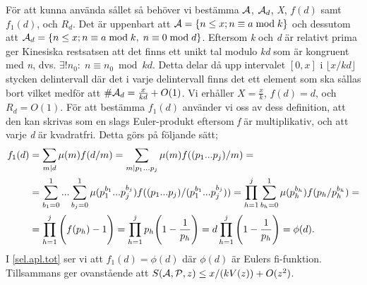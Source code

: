För att kunna använda sållet så behöver vi bestämma \(\A\), \(\A_d\), \textit{X}, \(f(d)\) samt \(f_1(d)\), och \(R_d\). 
Det är uppenbart att \(\A = \{n\leq x; n \equiv a \bmod k\}\) och dessutom att \(\A_d = \{n \leq x; n \equiv a \bmod k,\; n \equiv 0 \bmod d\}\). 
Eftersom \textit{k} och \textit{d} är relativt prima ger Kinesiska restsatsen att det finns ett unikt tal modulo \textit{kd} som är kongruent med \textit{n}, dvs. \(\exists! n_0:\; n \equiv n_0 \bmod kd\). 
Detta delar då upp intervalet \([0, x]\) i \(\lfloor x/{kd}\rfloor\) stycken delintervall där det i varje delintervall finns det ett element som ska sållas bort vilket medför att \(\#\A_d = \frac{x}{kd} + O(1)\). 
Vi erhåller \(X = \frac{x}{k}\), \(f(d) = d\), och \(R_d = O(1)\). 
För att bestämma \(f_1(d)\) använder vi oss av dess definition, att den kan skrivas som en slags Euler-produkt eftersom \textit{f} är multiplikativ, och att varje \textit{d} är kvadratfri. 
Detta görs på följande sätt;
\begin{align}
    f_1(d) &= \sum_{m\divides d}\mu(m)f(d/m) = \sum_{m\divides p_1...p_j}\mu(m)f((p_1...p_j)/m) = \nonumber\\
    &=\sum_{b_1 = 0}^1...\sum_{b_j = 0}^1\mu(p_1^{b_1}...p_j^{b_j})f((p_1...p_j)/(p_1^{b_1}...p_j^{b_j})) = \prod_{h = 1}^j\sum_{b_h = 0}^1\mu(p_h^{b_h})f(p_h/p_h^{b_h}) = \nonumber\\
    &= \prod_{h = 1}^j\Bigg(f(p_h) - 1\Bigg) = \prod_{h = 1}^j p_h\Bigg(1 - \frac{1}{p_h}\Bigg) = d\prod_{h = 1}^j \Bigg(1 - \frac{1}{p_h}\Bigg) = \phi(d).\label{sel.apl.tot}
\end{align}
I \eqref{sel.apl.tot} ser vi att \(f_1(d) = \phi(d)\) där \(\phi(d)\) är Eulers fi-funktion. 
Tillsammans ger ovanstående att \(\S{A}{P}{z} \leq x/(kV(z)) + O(z^2)\). 

